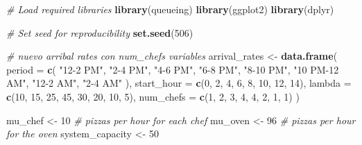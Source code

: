 \documentclass[
]{article}
\newenvironment{Shaded}{\begin{snugshade}}{\end{snugshade}}
\newcommand{\AttributeTok}[1]{\textcolor[rgb]{0.13,0.29,0.53}{#1}}
\newcommand{\CommentTok}[1]{\textcolor[rgb]{0.56,0.35,0.01}{\textit{#1}}}
\newcommand{\DecValTok}[1]{\textcolor[rgb]{0.00,0.00,0.81}{#1}}
\newcommand{\FunctionTok}[1]{\textcolor[rgb]{0.13,0.29,0.53}{\textbf{#1}}}
\newcommand{\NormalTok}[1]{#1}
\newcommand{\OtherTok}[1]{\textcolor[rgb]{0.56,0.35,0.01}{#1}}
\newcommand{\StringTok}[1]{\textcolor[rgb]{0.31,0.60,0.02}{#1}}
\begin{document}
\begin{Shaded}
\begin{Highlighting}[]
\CommentTok{\# Load required libraries}
\FunctionTok{library}\NormalTok{(queueing)}
\FunctionTok{library}\NormalTok{(ggplot2)}
\FunctionTok{library}\NormalTok{(dplyr)}

\CommentTok{\# Set seed for reproducibility}
\FunctionTok{set.seed}\NormalTok{(}\DecValTok{506}\NormalTok{)}
\end{Highlighting}
\end{Shaded}

\begin{Shaded}
\begin{Highlighting}[]
\CommentTok{\# nuevo arribal rates con num\_chefs variables}
\NormalTok{arrival\_rates }\OtherTok{\textless{}{-}} \FunctionTok{data.frame}\NormalTok{(}
  \AttributeTok{period =} \FunctionTok{c}\NormalTok{(}
    \StringTok{"12{-}2 PM"}\NormalTok{,}
    \StringTok{"2{-}4 PM"}\NormalTok{,}
    \StringTok{"4{-}6 PM"}\NormalTok{,}
    \StringTok{"6{-}8 PM"}\NormalTok{,}
    \StringTok{"8{-}10 PM"}\NormalTok{,}
    \StringTok{"10 PM{-}12 AM"}\NormalTok{,}
    \StringTok{"12{-}2 AM"}\NormalTok{,}
    \StringTok{"2{-}4 AM"}
\NormalTok{  ),}
  \AttributeTok{start\_hour =} \FunctionTok{c}\NormalTok{(}\DecValTok{0}\NormalTok{, }\DecValTok{2}\NormalTok{, }\DecValTok{4}\NormalTok{, }\DecValTok{6}\NormalTok{, }\DecValTok{8}\NormalTok{, }\DecValTok{10}\NormalTok{, }\DecValTok{12}\NormalTok{, }\DecValTok{14}\NormalTok{),}
  \AttributeTok{lambda =} \FunctionTok{c}\NormalTok{(}\DecValTok{10}\NormalTok{, }\DecValTok{15}\NormalTok{, }\DecValTok{25}\NormalTok{, }\DecValTok{45}\NormalTok{, }\DecValTok{30}\NormalTok{, }\DecValTok{20}\NormalTok{, }\DecValTok{10}\NormalTok{, }\DecValTok{5}\NormalTok{),}
  \AttributeTok{num\_chefs =} \FunctionTok{c}\NormalTok{(}\DecValTok{1}\NormalTok{, }\DecValTok{2}\NormalTok{, }\DecValTok{3}\NormalTok{, }\DecValTok{4}\NormalTok{, }\DecValTok{4}\NormalTok{, }\DecValTok{2}\NormalTok{, }\DecValTok{1}\NormalTok{, }\DecValTok{1}\NormalTok{)}
\NormalTok{)}

\NormalTok{mu\_chef }\OtherTok{\textless{}{-}} \DecValTok{10}   \CommentTok{\# pizzas per hour for each chef}
\NormalTok{mu\_oven }\OtherTok{\textless{}{-}} \DecValTok{96}   \CommentTok{\# pizzas per hour for the oven}
\NormalTok{system\_capacity }\OtherTok{\textless{}{-}} \DecValTok{50}
\end{Highlighting}
\end{Shaded}
\end{document}
